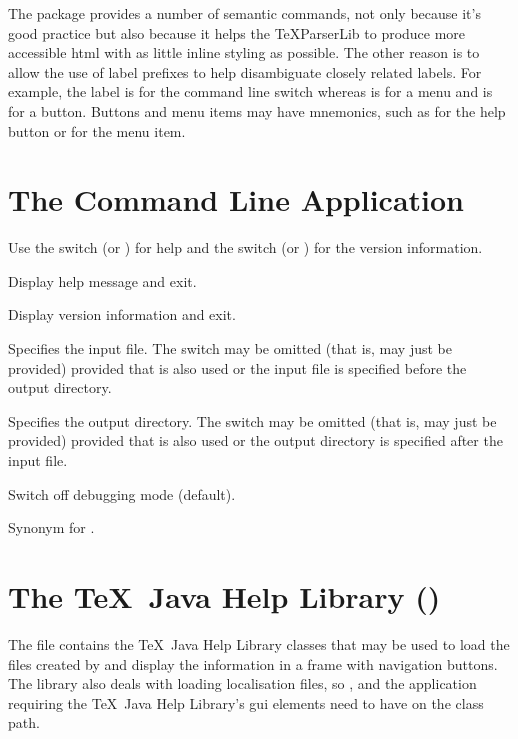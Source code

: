 \documentclass[toc=listof]{scrreport}
\begin{document}
The  package provides a number of semantic commands, not only
because it's good practice but also because it helps the \gls{TeXParserLib} to
produce more accessible \gls{html} with as little inline styling as possible.
The other reason is to allow the use of label prefixes to help disambiguate
closely related labels.  For example, the label  is for the
command line switch  whereas  is for a 
menu and  is for a  button.
Buttons and menu items may have mnemonics, such as
 for the help button or 
for the  menu item.

\chapter{The  Command Line Application}
\label{sec:texjavahelpmk}


Use the  switch 
(or ) for help and the
 switch
(or ) for the version information.

Display help message and exit.

Display version information and exit.

Specifies the input file. The switch may be omitted (that is,
 may just be provided) provided that
 is also used or the input file is specified before
the output directory.

Specifies the output directory. The switch may be omitted
(that is,  may just be provided) provided that
 is also used or the output directory is specified after
the input file.

Switch off debugging mode (default).

Synonym for .

\chapter{The \TeX\ Java Help Library ()}
\label{sec:texjavahelplib}

The  file contains the 
\TeX\ Java Help Library classes that may be used to load the
files created by  and display the information in
a frame with navigation buttons. The library also deals with loading
localisation files, so ,  and the
application requiring the \TeX\ Java Help Library's \gls{gui}
elements need to have  on the class path.
\end{document}
